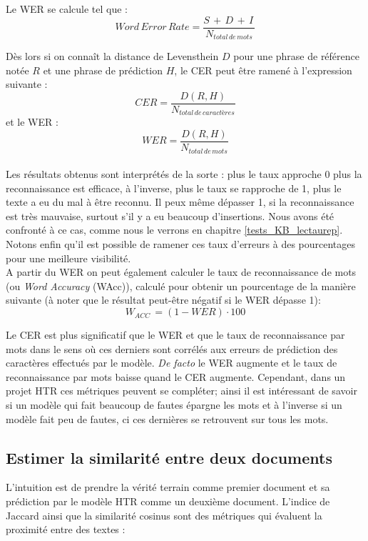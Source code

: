 Le WER se calcule tel que : $$ Word\, Error\, Rate = \frac{S\, + \,D\, + \,I\,}{N_{total\, de\, mots}} $$

Dès lors si on connaît la distance de Levensthein $D$ pour une phrase de référence notée $R$ et une phrase de prédiction $H$, le CER peut être ramené à l'expression suivante : $$CER = \frac{D(R,H)}{N_{total\, de\, caractères}}$$  et le WER :$$WER = \frac{D(R,H)}{N_{total\, de\, mots}}$$\\

Les résultats obtenus sont interprétés de la sorte : plus le taux approche 0 plus la reconnaissance est efficace, à l'inverse, plus le taux se rapproche de 1, plus le texte a eu du mal à être reconnu. Il peux même dépasser 1, si la reconnaissance est très mauvaise, surtout s'il y a eu beaucoup d'insertions. Nous avons été confronté à ce cas, comme nous le verrons en chapitre \ref{tests_KB_lectaurep}. Notons enfin qu'il est possible de ramener ces taux d'erreurs à des pourcentages pour une meilleure visibilité.\\

A partir du WER on peut également calculer le taux de reconnaissance de mots (ou \textit{Word Accuracy} (WAcc)), calculé pour obtenir un pourcentage de la manière suivante (à noter que le résultat peut-être négatif si le WER dépasse 1): $$W_{ACC}\, = (1 - WER) \cdot 100  $$

Le CER est plus significatif que le WER et que le taux de reconnaissance par mots dans le sens où ces derniers sont corrélés aux erreurs de prédiction des caractères effectués par le modèle. \textit{De facto} le WER augmente et le taux de reconnaissance par mots baisse quand le CER augmente. Cependant, dans un projet HTR ces métriques peuvent se compléter; ainsi il est intéressant de savoir si un modèle qui fait beaucoup de fautes épargne les mots et à l'inverse si un modèle fait peu de fautes, ci ces dernières se retrouvent sur tous les mots.

\subsection{Estimer la similarité entre deux documents}

L'intuition est de prendre la vérité terrain comme premier document et sa prédiction par le modèle HTR comme un deuxième document. L'indice de Jaccard ainsi que la similarité cosinus sont des métriques qui évaluent la proximité entre des textes :\\

